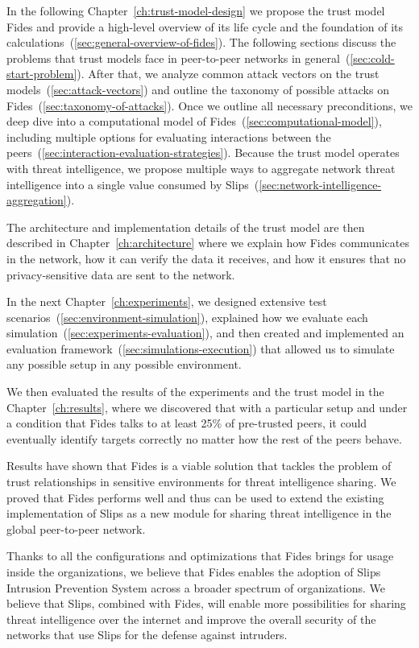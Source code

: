 In the following Chapter~\ref{ch:trust-model-design} we propose the trust model Fides and provide a high-level overview of its life cycle and the foundation of its calculations~(\ref{sec:general-overview-of-fides}).
The following sections discuss the problems that trust models face in peer-to-peer networks in general~(\ref{sec:cold-start-problem}).
After that, we analyze common attack vectors on the trust models~(\ref{sec:attack-vectors}) and outline the taxonomy of possible attacks on Fides~(\ref{sec:taxonomy-of-attacks}).
Once we outline all necessary preconditions, we deep dive into a computational model of Fides~(\ref{sec:computational-model}), including multiple options for evaluating interactions between the peers~(\ref{sec:interaction-evaluation-strategies}).
Because the trust model operates with threat intelligence, we propose multiple ways to aggregate network threat intelligence into a single value consumed by Slips~(\ref{sec:network-intelligence-aggregation}).

The architecture and implementation details of the trust model are then described in Chapter~\ref{ch:architecture} where we explain how Fides communicates in the network, how it can verify the data it receives, and how it ensures that no privacy-sensitive data are sent to the network.

In the next Chapter~\ref{ch:experiments}, we designed extensive test scenarios~(\ref{sec:environment-simulation}), explained how we evaluate each simulation~(\ref{sec:experiments-evaluation}), and then created and implemented an evaluation framework~(\ref{sec:simulations-execution}) that allowed us to simulate any possible setup in any possible environment.

We then evaluated the results of the experiments and the trust model in the Chapter~\ref{ch:results}, where we discovered that with a particular setup and under a condition that Fides talks to at least 25\% of pre-trusted peers, it could eventually identify targets correctly no matter how the rest of the peers behave.

Results have shown that Fides is a viable solution that tackles the problem of trust relationships in sensitive environments for threat intelligence sharing. 
We proved that Fides performs well and thus can be used to extend the existing implementation of Slips as a new module for sharing threat intelligence in the global peer-to-peer network.

Thanks to all the configurations and optimizations that Fides brings for usage inside the organizations, we believe that Fides enables the adoption of Slips Intrusion Prevention System across a broader spectrum of organizations.
We believe that Slips, combined with Fides, will enable more possibilities for sharing threat intelligence over the internet and improve the overall security of the networks that use Slips for the defense against intruders.


